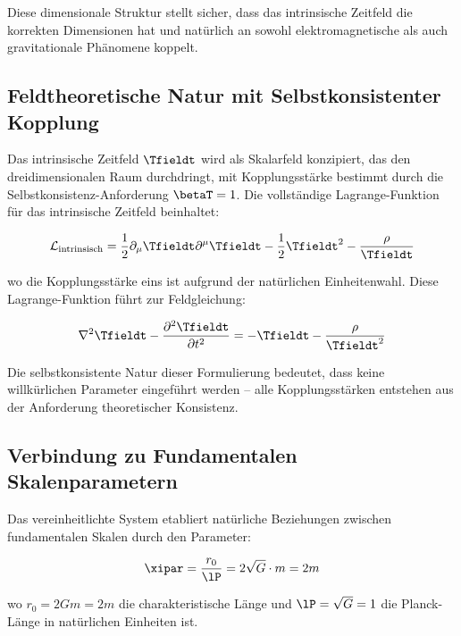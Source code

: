 	Diese dimensionale Struktur stellt sicher, dass das intrinsische Zeitfeld die korrekten Dimensionen hat und natürlich an sowohl elektromagnetische als auch gravitationale Phänomene koppelt.
	
	\subsection{Feldtheoretische Natur mit Selbstkonsistenter Kopplung}
	\label{subsec:field_theoretic_self_consistent}
	
	Das intrinsische Zeitfeld $\Tfieldt$ wird als Skalarfeld konzipiert, das den dreidimensionalen Raum durchdringt, mit Kopplungsstärke bestimmt durch die Selbstkonsistenz-Anforderung $\betaT = 1$. Die vollständige Lagrange-Funktion für das intrinsische Zeitfeld beinhaltet:
	
	\begin{equation}
		\mathcal{L}_{\text{intrinsisch}} = \frac{1}{2} \partial_\mu \Tfieldt \partial^\mu \Tfieldt - \frac{1}{2}\Tfieldt^2 - \frac{\rho}{\Tfieldt}
	\end{equation}
	
	wo die Kopplungsstärke eins ist aufgrund der natürlichen Einheitenwahl. Diese Lagrange-Funktion führt zur Feldgleichung:
	
	\begin{equation}
		\nabla^2 \Tfieldt - \frac{\partial^2 \Tfieldt}{\partial t^2} = -\Tfieldt - \frac{\rho}{\Tfieldt^2}
	\end{equation}
	
	Die selbstkonsistente Natur dieser Formulierung bedeutet, dass keine willkürlichen Parameter eingeführt werden – alle Kopplungsstärken entstehen aus der Anforderung theoretischer Konsistenz.
	
	\subsection{Verbindung zu Fundamentalen Skalenparametern}
	\label{subsec:fundamental_scales}
	
	Das vereinheitlichte System etabliert natürliche Beziehungen zwischen fundamentalen Skalen durch den Parameter:
	
	\begin{equation}
		\xipar = \frac{r_0}{\lP} = 2\sqrt{G} \cdot m = 2m
	\end{equation}
	
	wo $r_0 = 2Gm = 2m$ die charakteristische Länge und $\lP = \sqrt{G} = 1$ die Planck-Länge in natürlichen Einheiten ist.
	
